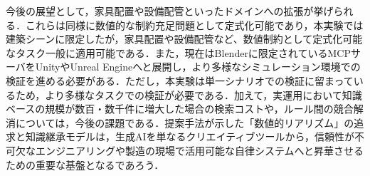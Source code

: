 \documentclass[dvipdfmx, a4paper, 9pt]{deimj}
\begin{document}
今後の展望として，家具配置や設備配管といったドメインへの拡張が挙げられる．これらは同様に数値的な制約充足問題として定式化可能であり，本実験では建築シーンに限定したが，家具配置や設備配管など、数値制約として定式化可能なタスク一般に適用可能である．また，現在はBlenderに限定されているMCPサーバをUnityやUnreal Engineへと展開し，より多様なシミュレーション環境での検証を進める必要がある．ただし，本実験は単一シナリオでの検証に留まっているため，より多様なタスクでの検証が必要である．加えて，実運用において知識ベースの規模が数百・数千件に増大した場合の検索コストや，ルール間の競合解消については，今後の課題である．提案手法が示した「数値的リアリズム」の追求と知識継承モデルは，生成AIを単なるクリエイティブツールから，信頼性が不可欠なエンジニアリングや製造の現場で活用可能な自律システムへと昇華させるための重要な基盤となるであろう．




\end{document}
